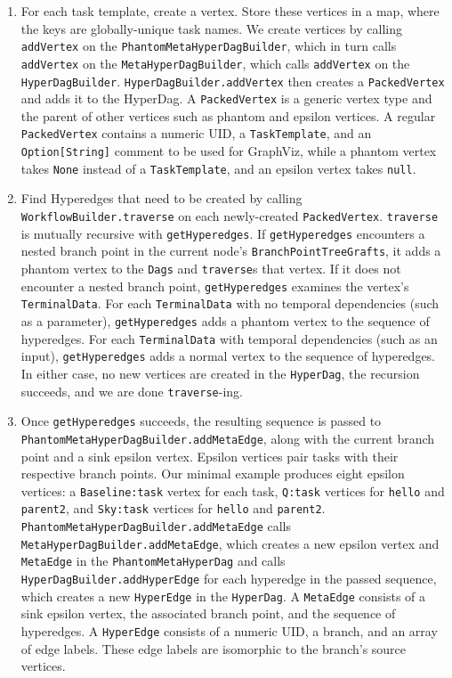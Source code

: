 \documentclass{report}
\begin{document}
\begin{enumerate}

\item For each task template, create a vertex. Store these vertices in a map, where the keys are globally-unique task names.
      We create vertices by calling \texttt{addVertex} on the \texttt{PhantomMetaHyperDagBuilder}, which in turn calls \texttt{addVertex}
      on the \texttt{MetaHyperDagBuilder}, which calls \texttt{addVertex} on the \texttt{HyperDagBuilder}. \texttt{HyperDagBuilder.addVertex}
      then creates a \texttt{PackedVertex} and adds it to the HyperDag. A \texttt{PackedVertex} is a generic vertex type and the parent of other
      vertices such as phantom and epsilon vertices. A regular \texttt{PackedVertex} contains a numeric UID, a \texttt{TaskTemplate}, and an
      \texttt{Option[String]} comment to be used for GraphViz, while a phantom vertex takes \texttt{None} instead of a \texttt{TaskTemplate}, and an
      epsilon vertex takes \texttt{null}.

\item Find Hyperedges that need to be created by calling \texttt{WorkflowBuilder.traverse} on each newly-created \texttt{PackedVertex}. \texttt{traverse}
      is mutually recursive with \texttt{getHyperedges}. If \texttt{getHyperedges} encounters a nested branch point in the current node's
      \texttt{BranchPointTreeGrafts}, it adds a phantom vertex to the \texttt{Dags} and \texttt{traverse}s that vertex. If it does not encounter a nested branch point,
      \texttt{getHyperedges} examines the vertex's \texttt{TerminalData}. For each \texttt{TerminalData} with  no temporal dependencies (such as a parameter),
      \texttt{getHyperedges} adds a phantom vertex to the sequence of hyperedges. For each \texttt{TerminalData} with temporal dependencies (such as an input),
      \texttt{getHyperedges} adds a normal vertex to the sequence of hyperedges. In either case, no new vertices are created in the \texttt{HyperDag}, the recursion
      succeeds, and we are done \texttt{traverse}-ing.

\item Once \texttt{getHyperedges} succeeds, the resulting sequence is passed to \texttt{PhantomMetaHyperDagBuilder.addMetaEdge}, along with the current
      branch point and a sink epsilon vertex. Epsilon vertices pair tasks with their respective branch points. Our minimal example produces eight epsilon
      vertices: a \texttt{Baseline:task} vertex for each task, \texttt{Q:task} vertices for \texttt{hello} and \texttt{parent2}, and \texttt{Sky:task} vertices
      for \texttt{hello} and \texttt{parent2}. \texttt{PhantomMetaHyperDagBuilder.addMetaEdge} calls \texttt{MetaHyperDagBuilder.addMetaEdge}, which creates a new
      epsilon vertex and \texttt{MetaEdge} in the \texttt{PhantomMetaHyperDag} and calls \texttt{HyperDagBuilder.addHyperEdge} for each hyperedge in the passed
      sequence, which creates a new \texttt{HyperEdge} in the \texttt{HyperDag}. A \texttt{MetaEdge} consists of a sink epsilon vertex, the associated branch point,
      and the sequence of hyperedges. A \texttt{HyperEdge} consists of a numeric UID, a branch, and an array of edge labels. These edge labels are isomorphic to the
      branch's source vertices.


\end{enumerate}
\end{document}
